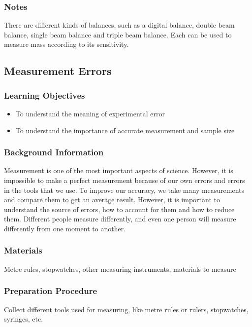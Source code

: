 \subsubsection*{Notes}
There are different kinds of balances, such as a digital balance, double beam balance, single beam balance and triple beam balance. Each can be used to measure mass according to its sensitivity.

\subsection{Measurement Errors}

\subsubsection*{Learning Objectives}
\begin{itemize}
\item{To understand the meaning of experimental error}
\item{To understand the importance of accurate measurement and sample size}
\end{itemize}

\subsubsection*{Background Information}
Measurement is one of the most important aspects of science. However, it is impossible to make a perfect measurement because of our own errors and errors in the tools that we use. To improve our accuracy, we take many measurements and compare them to get an average result. However, it is important to understand the source of errors, how to account for them and how to reduce them. Different people measure differently, and even one person will measure differently from one moment to another.

\subsubsection*{Materials}
Metre rules, stopwatches, other measuring instruments, materials to measure

\subsubsection*{Preparation Procedure}
Collect different tools used for measuring, like metre rules or rulers, stopwatches, syringes, etc.

